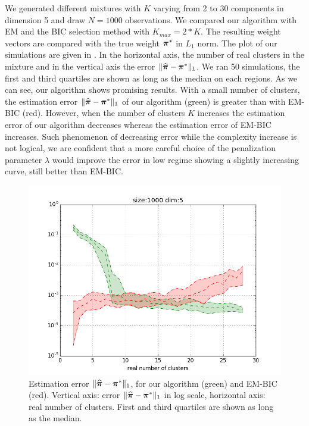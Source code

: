 We generated different mixtures with $K$ varying from 2 to 30 components in dimension 5 and draw $N=1000$ observations. We compared our algorithm with EM and the BIC selection method with $K_{max}=2*K$. The resulting weight vectors are compared with the true weight $\boldsymbol \pi^*$ in $L_1$ norm. The plot of our simulations are given in . In the horizontal axis, the number of real clusters in the mixture and in the vertical axis the error  $\|\widehat{\boldsymbol \pi}-\boldsymbol \pi^*\|_1$. We ran 50 simulations, the first and third quartiles are shown as long as the median on each regions. As we can see, our algorithm shows promising results. With a small number of clusters, the estimation error $\|\widehat{\boldsymbol \pi}-\boldsymbol \pi^*\|_1$ of our algorithm (green) is greater than with EM-BIC (red). However, when the number of clusters $K$ increases the estimation error of our algorithm decreases whereas the estimation error of EM-BIC increases. Such phenomenon of decreasing error while the complexity increase is not logical, we are confident that a more careful choice of the penalization parameter $\lambda$ would improve the error in low regime showing a slightly increasing curve, still better than EM-BIC.
\begin{figure}
\center
  \includegraphics[scale=0.5]{./TeX_files/SparseWeightsVectorEstimation.png}
  \caption{Estimation error $\|\widehat{\boldsymbol \pi}-\boldsymbol \pi^*\|_1$, for our algorithm (green) and EM-BIC (red). Vertical axis: error $\|\widehat{\boldsymbol \pi}-\boldsymbol \pi^*\|_1$ in log scale, horizontal axis: real number of clusters. First and third quartiles are shown as long as the median.}
  \label{fig:results_alpha_pen}
\end{figure}
